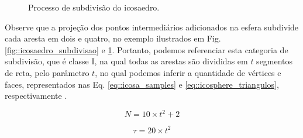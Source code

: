 \documentclass[
    12pt,                %
    oneside,            %
    a4paper,            %
    english,            %
    french,                %
    spanish,            %
    brazil                %
    ]{abntex2}
\begin{document}
\begin{figure}[ht]
\centering
\captionsetup[subfloat]{farskip=0pt,nearskip=0pt}
\centering
    \hspace{1em}
     \caption{Processo de subdivisão do icosaedro.}
    \label{fig::icosaedro_subdivisao_4}
\end{figure}

Observe que a projeção dos pontos intermediários adicionados na esfera subdivide cada aresta em dois e quatro, no exemplo ilustrados em Fig. \ref{fig::icosaedro_subdivisao} e \ref{fig::icosaedro_subdivisao_4}. Portanto, podemos referenciar esta categoria de subdivisão, que é classe I, na qual todas as arestas são divididas em $t$ segmentos de reta, pelo parâmetro $t$, no qual podemos inferir a quantidade de vértices e faces, representados nas Eq. \ref{eq::icosa_samples} e \ref{eq::icosphere_triangulos}, respectivamente \cite{popko2012}.

\begin{equation}
\label{eq::icosa_samples}
    N = 10\times t^2 + 2
\end{equation}

\begin{equation}
\label{eq::icosphere_triangulos}
\tau = 20\times t^2
\end{equation}
\end{document}

